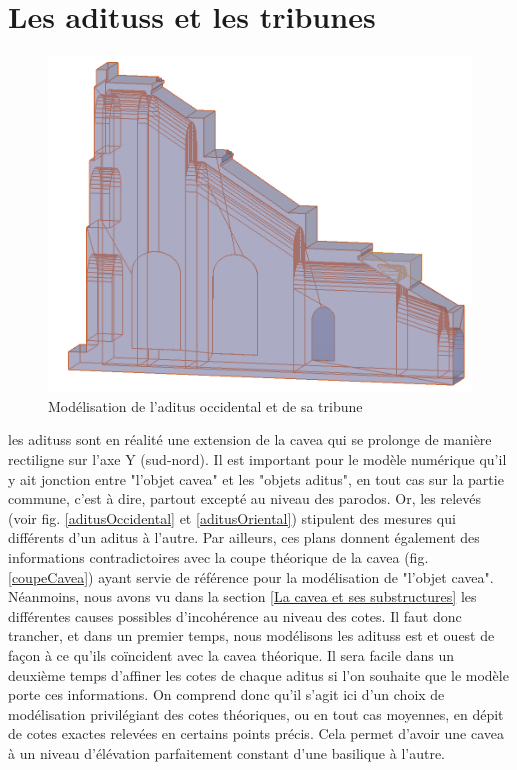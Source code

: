 		
\section{Les \glspl{aditus} et les tribunes} 

\begin{figure}[!h]
	\includegraphics[width=\linewidth]{images/modAditus}
	\caption{Modélisation de l'\gls{aditus} occidental et de sa tribune} 
	\label{modAditus} 
\end{figure}  
		
les \glspl{aditus} sont en réalité une extension de la \gls{cavea} qui se prolonge de manière rectiligne sur l'axe Y (sud-nord). Il est important pour le modèle numérique qu'il y ait jonction entre "l'objet cavea" et les "objets aditus", en tout cas sur la partie commune, c'est à dire, partout excepté au niveau des \gls{parodos}. Or, les relevés (voir fig. \ref{aditusOccidental} et \ref{aditusOriental}) stipulent des mesures qui différents d'un \gls{aditus} à l'autre. Par ailleurs, ces plans donnent également des informations contradictoires avec la coupe théorique de la \gls{cavea} (fig. \ref{coupeCavea}) ayant servie de référence pour la modélisation de "l'objet cavea". Néanmoins, nous avons vu dans la section \ref{La cavea et ses substructures} les différentes causes possibles d'incohérence au niveau des cotes. Il faut donc trancher, et dans un premier temps, nous modélisons les \glspl{aditus} est et ouest de façon à ce qu'ils coïncident avec la \gls{cavea} théorique. Il sera facile dans un deuxième temps d'affiner les cotes de chaque  \gls{aditus} si l'on souhaite que le modèle porte ces informations. On comprend donc qu'il s'agit ici d'un choix de modélisation privilégiant des cotes théoriques, ou en tout cas moyennes, en dépit de cotes exactes relevées en certains points précis. Cela permet d'avoir une \gls{cavea} à un niveau d'élévation parfaitement constant d'une \gls{basilique} à l'autre. 

